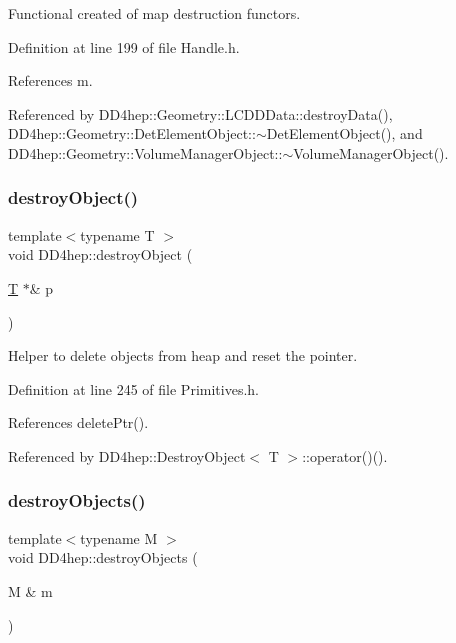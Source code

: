 Functional created of map destruction functors. 



Definition at line 199 of file Handle.\+h.



References m.



Referenced by D\+D4hep\+::\+Geometry\+::\+L\+C\+D\+D\+Data\+::destroy\+Data(), D\+D4hep\+::\+Geometry\+::\+Det\+Element\+Object\+::$\sim$\+Det\+Element\+Object(), and D\+D4hep\+::\+Geometry\+::\+Volume\+Manager\+Object\+::$\sim$\+Volume\+Manager\+Object().

\hypertarget{namespace_d_d4hep_a810f6459a5e1e3e5e55f081862bb4d16}{}\label{namespace_d_d4hep_a810f6459a5e1e3e5e55f081862bb4d16} 
\subsubsection{\texorpdfstring{destroy\+Object()}{destroyObject()}}
{\footnotesize\ttfamily template$<$typename T $>$ \\
void D\+D4hep\+::destroy\+Object (\begin{DoxyParamCaption}\item[{\hyperlink{class_t}{T} $\ast$\&}]{p }\end{DoxyParamCaption})\hspace{0.3cm}{\ttfamily [inline]}}



Helper to delete objects from heap and reset the pointer. 



Definition at line 245 of file Primitives.\+h.



References delete\+Ptr().



Referenced by D\+D4hep\+::\+Destroy\+Object$<$ T $>$\+::operator()().

\hypertarget{namespace_d_d4hep_ae239c6d3c17def89a9b82c1ea27a9fd7}{}\label{namespace_d_d4hep_ae239c6d3c17def89a9b82c1ea27a9fd7} 
\subsubsection{\texorpdfstring{destroy\+Objects()}{destroyObjects()}}
{\footnotesize\ttfamily template$<$typename M $>$ \\
void D\+D4hep\+::destroy\+Objects (\begin{DoxyParamCaption}\item[{M \&}]{m }\end{DoxyParamCaption})}



